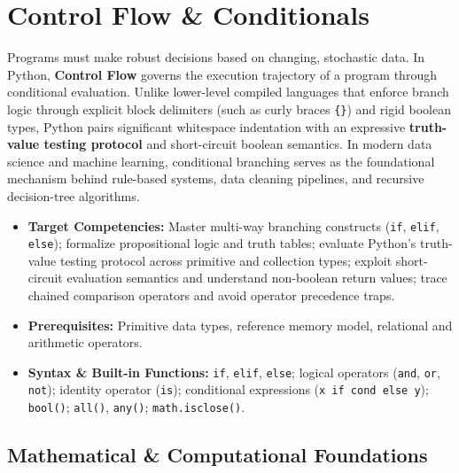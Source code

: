 \chapter{Control Flow \& Conditionals}

Programs must make robust decisions based on changing, stochastic data. In Python, \textbf{Control Flow} governs the execution trajectory of a program through conditional evaluation. Unlike lower-level compiled languages that enforce branch logic through explicit block delimiters (such as curly braces \texttt{\{\}}) and rigid boolean types, Python pairs significant whitespace indentation with an expressive \textbf{truth-value testing protocol} and short-circuit boolean semantics. In modern data science and machine learning, conditional branching serves as the foundational mechanism behind rule-based systems, data cleaning pipelines, and recursive decision-tree algorithms.

\vspace{0.5cm}
\begin{tcolorbox}[colback=primarylight, colframe=primarydark, title={\textbf{Executive Roadmap \& Learning Objectives}}]
\begin{itemize}
    \item \textbf{Target Competencies:} Master multi-way branching constructs (\texttt{if}, \texttt{elif}, \texttt{else}); formalize propositional logic and truth tables; evaluate Python's truth-value testing protocol across primitive and collection types; exploit short-circuit evaluation semantics and understand non-boolean return values; trace chained comparison operators and avoid operator precedence traps.
    \item \textbf{Prerequisites:} Primitive data types, reference memory model, relational and arithmetic operators.
    \item \textbf{Syntax \& Built-in Functions:} \texttt{if}, \texttt{elif}, \texttt{else}; logical operators (\texttt{and}, \texttt{or}, \texttt{not}); identity operator (\texttt{is}); conditional expressions (\texttt{x if cond else y}); \texttt{bool()}; \texttt{all()}, \texttt{any()}; \texttt{math.isclose()}.
\end{itemize}
\end{tcolorbox}

\section{Mathematical \& Computational Foundations}

